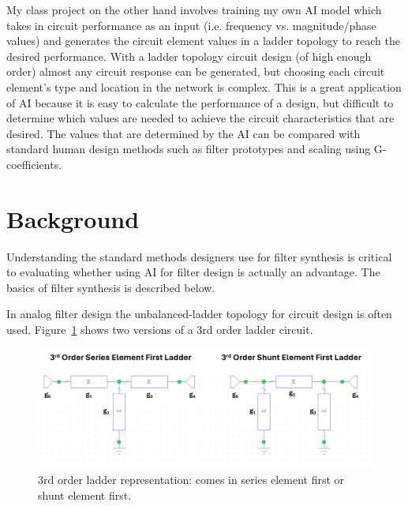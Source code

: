 \documentclass[10pt,conference]{IEEEtran}
\begin{document}
My class project on the other hand involves training my own AI model which takes in circuit performance as an input (i.e. frequency vs. magnitude/phase values) and generates the circuit element values in a ladder topology to reach the desired performance. With a ladder topology circuit design (of high enough order) almost any circuit response can be generated, but choosing each circuit element's type and location in the network is complex. This is a great application of AI because it is easy to calculate the performance of a design, but difficult to determine which values are needed to achieve the circuit characteristics that are desired. The values that are determined by the AI can be compared with standard human design methods such as filter prototypes and scaling using G-coefficients.



\section{Background}

Understanding the standard methods designers use for filter synthesis is critical to evaluating whether using AI for filter design is actually an advantage. The basics of filter synthesis is described below.

In analog filter design the unbalanced-ladder topology for circuit design is often used. Figure~\ref{Ladder_Topology_3rd_order} shows two versions of a 3rd order ladder circuit.

\begin{figure}
	\centering
	\includegraphics[width=0.9\linewidth]{Figures/Ladder_Topology_3rd_order.png}
	\caption{3rd order ladder representation: comes in series element first or shunt element first.}
	\label{Ladder_Topology_3rd_order}
\end{figure}





\end{document}
